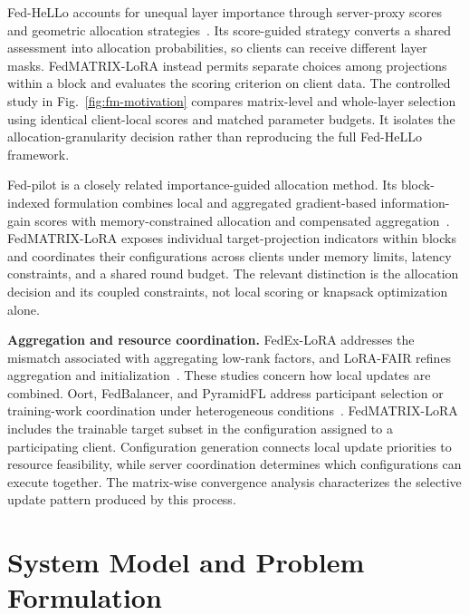 \documentclass[10pt,conference,letterpaper]{IEEEtran}
\begin{document}
Fed-HeLLo accounts for unequal layer importance through server-proxy scores and geometric allocation strategies~\cite{zhang2025fedhello}. Its score-guided strategy converts a shared assessment into allocation probabilities, so clients can receive different layer masks. FedMATRIX-LoRA instead permits separate choices among projections within a block and evaluates the scoring criterion on client data. The controlled study in Fig.~\ref{fig:fm-motivation} compares matrix-level and whole-layer selection using identical client-local scores and matched parameter budgets. It isolates the allocation-granularity decision rather than reproducing the full Fed-HeLLo framework.

Fed-pilot is a closely related importance-guided allocation method. Its block-indexed formulation combines local and aggregated gradient-based information-gain scores with memory-constrained allocation and compensated aggregation~\cite{fm_fedpilot2025}. FedMATRIX-LoRA exposes individual target-projection indicators within blocks and coordinates their configurations across clients under memory limits, latency constraints, and a shared round budget. The relevant distinction is the allocation decision and its coupled constraints, not local scoring or knapsack optimization alone.

\noindent\textbf{Aggregation and resource coordination.}
FedEx-LoRA addresses the mismatch associated with aggregating low-rank factors, and LoRA-FAIR refines aggregation and initialization~\cite{singhal2025fedex,bian2025lorafair}. These studies concern how local updates are combined. Oort, FedBalancer, and PyramidFL address participant selection or training-work coordination under heterogeneous conditions~\cite{lai2021oort,shin2022fedbalancer,li2022pyramidfl}. FedMATRIX-LoRA includes the trainable target subset in the configuration assigned to a participating client. Configuration generation connects local update priorities to resource feasibility, while server coordination determines which configurations can execute together. The matrix-wise convergence analysis characterizes the selective update pattern produced by this process.

\section{System Model and Problem Formulation}\label{sec.model}
\end{document}
